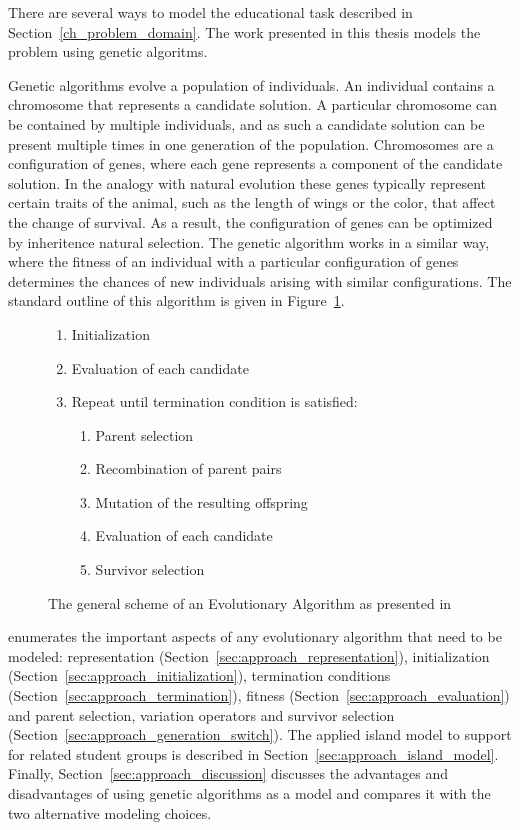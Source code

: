 \label{ch_approach}
There are several ways to model the educational task described in
Section~\ref{ch_problem_domain}. The work presented in this thesis models the
problem using genetic algoritms.

Genetic algorithms evolve a population of individuals. An individual contains a
chromosome that represents a candidate solution. A particular chromosome can be contained by
multiple individuals, and as such a candidate solution can be present multiple
times in one generation of the population. Chromosomes are a configuration of
genes, where each gene represents a component of the candidate solution. In the
analogy with natural evolution these genes typically represent certain traits
of the animal, such as the length of wings or the color, that affect the change
of survival. As a result, the configuration of genes can be optimized by inheritence
natural selection. The genetic algorithm works in a similar way, where the
fitness of an individual with a particular configuration of genes determines
the chances of new individuals arising with similar configurations. The
standard outline of this algorithm is given in Figure~\ref{alg:ea_scheme}.
\label{approach_genetic_algorithm}
\begin{figure}[ht!]
	\begin{framed}
		\begin{enumerate}
			\item Initialization
			\item Evaluation of each candidate
			\item Repeat until termination condition is satisfied:
				\begin{enumerate}
					\item Parent selection
					\item Recombination of parent pairs
					\item Mutation of the resulting offspring
					\item Evaluation of each candidate
					\item Survivor selection
				\end{enumerate}
		\end{enumerate}
	\end{framed}
	\caption[The evolutionary algorithm]{The general scheme of an
		Evolutionary Algorithm as presented in \citep{Eiben2007}}
	\label{alg:ea_scheme}
\end{figure}

\citep{Eiben2007} enumerates the important aspects of any
evolutionary algorithm that need to be modeled: representation
(Section~\ref{sec:approach_representation}), initialization
(Section~\ref{sec:approach_initialization}), termination conditions
(Section~\ref{sec:approach_termination}), fitness
(Section~\ref{sec:approach_evaluation}) and parent selection, variation
operators and survivor selection
(Section~\ref{sec:approach_generation_switch}). The applied island model to
support for related student groups is described in
Section~\ref{sec:approach_island_model}.
Finally, Section~\ref{sec:approach_discussion} discusses the advantages and
disadvantages of using genetic algorithms as a model and compares it with the
two alternative modeling choices.


